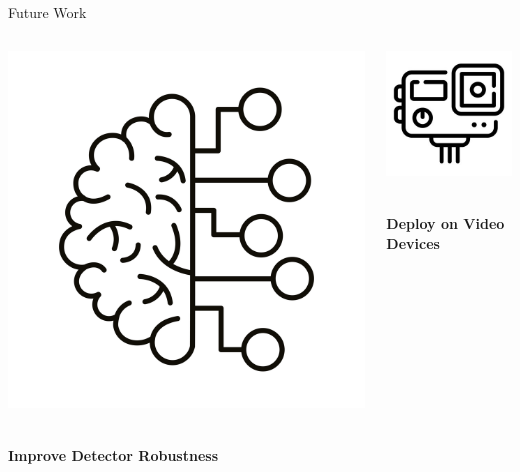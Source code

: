 \documentclass[serif]{beamer}  %
\begin{document}
\begin{frame}{Future Work}
    
    \vspace{1.5em} %
    
    \begin{columns}[T,totalwidth=\textwidth] %
        
        \begin{column}{0.32\textwidth}
            \centering
            \includegraphics[width=0.6\linewidth]{images/brain_icon.jpg}
            \vspace{1em}
            \parbox{\linewidth}{\centering\textbf{\\Improve Detector Robustness}}
        \end{column}
        
        \begin{column}{0.32\textwidth}
            \centering
            \includegraphics[width=0.6\linewidth]{images/video_icon.jpg}
            \vspace{1em}
            \parbox{\linewidth}{\centering\textbf{\\Deploy on Video Devices}}
        \end{column}
        

\end{columns}
\end{frame}
\end{document}
